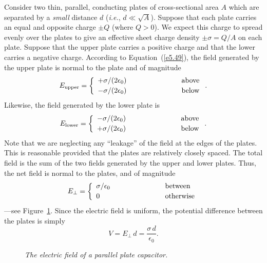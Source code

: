 Consider two thin, parallel, conducting 
plates of cross-sectional area $A$ which are separated by
a {\em small}\/ distance $d$ ({\em i.e.}, $d\ll \sqrt{A}$). Suppose that each plate
carries an equal and opposite charge $\pm Q$ (where $Q>0$). We expect this charge to
spread evenly over the plates to give an effective sheet charge density 
$\pm\sigma = Q/A$ on each plate. Suppose that the upper plate carries a
positive charge and that the lower carries a negative charge. According to
Equation~(\ref{e5.49}), the field generated by the upper plate is normal to the plate and
of magnitude
\begin{equation}
E_{\rm upper} =\left\{
\begin{array}{lcl}
+\sigma /(2 \epsilon_0)&\mbox{\hspace{2cm}}&\mbox{above}
\\[0.5ex]
-\sigma/(2\epsilon_0)& \mbox{\hspace{2cm}}&\mbox{below}
\end{array}\right..
\end{equation}
Likewise, the field generated by the lower plate is
\begin{equation}
E_{\rm lower} =\left\{
\begin{array}{lcl}
-\sigma /(2 \epsilon_0)&\mbox{\hspace{2cm}}&\mbox{above}
\\[0.5ex]
+\sigma/(2\epsilon_0)& \mbox{\hspace{2cm}}&\mbox{below}
\end{array}\right..
\end{equation}
Note that we are neglecting any ``leakage'' of the field at the edges of the plates.
This is reasonable provided that the plates are relatively closely spaced. The total field is the
sum of the two fields generated by the upper and lower plates. Thus, the net field
is normal to the plates, and of magnitude
\begin{equation}
E_\perp =\left\{
\begin{array}{lcl}
\sigma /\epsilon_0&\mbox{\hspace{2cm}}&\mbox{between}
\\[0.5ex]
0& \mbox{\hspace{2cm}}&\mbox{otherwise}
\end{array}\right.
\end{equation}
---see Figure~\ref{fplate}.
Since the electric field is uniform, the potential difference between the
plates is simply
\begin{equation}
V = E_\perp\,d = \frac{\sigma \,d}{\epsilon_0}.
\end{equation}
\begin{figure}
\centerline{}
\caption{\em The electric field of a parallel plate capacitor.}\label{fplate}
\end{figure}

